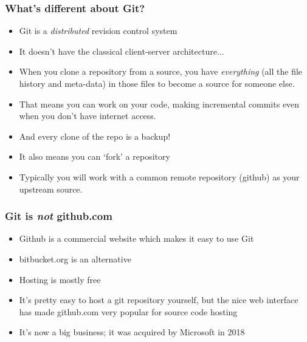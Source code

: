 \documentclass{beamer}
\begin{document}
\begin{frame}
  \frametitle{What's different about Git?}
  \begin{itemize}
  \item Git is a \emph{distributed} revision control system
    \pause \item It doesn't have the classical client-server architecture...
    \pause \item When you \alert{clone} a repository from a source, you have
    \emph{everything} (all the file history and meta-data) in those
    files to become a source for someone else.
    \pause \item That means you can work on your code, making incremental
    \alert{commits} even when you don't have internet access.
  \item And every clone of the \alert{repo} is a backup!
  \pause \item It also means you can `\alert{fork}' a repository
    \pause \item Typically you will work with a common
    \alert{remote} repository (github) as your \alert{upstream} source.
  \end{itemize}
\end{frame}

\begin{frame}
  \frametitle{Git is \emph{not} github.com}
  \begin{itemize}
  \item Github is a commercial website which makes it easy to use Git
  \item bitbucket.org is an alternative
  \pause \item Hosting is mostly free
  \pause \item It's pretty easy to host a git repository yourself, but
  the nice web interface has made github.com very
  popular for source code hosting
  \pause \item It's now a big business; it was acquired by Microsoft in 2018
  \end{itemize}
\end{frame}
\end{document}
